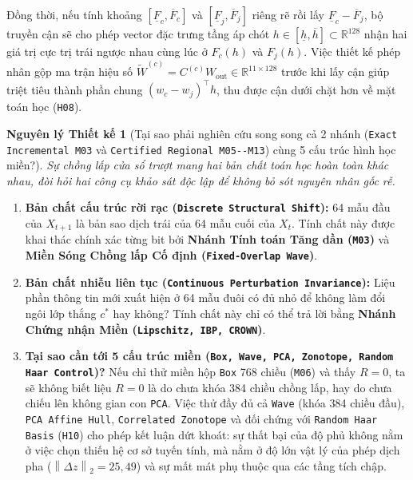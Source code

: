 \documentclass[11pt,a4paper]{article}
\newcommand{\R}{\mathbb{R}}
\newcommand{\norm}[1]{\left\lVert #1\right\rVert}
\newcommand{\code}[1]{{\small\ttfamily\nolinkurl{#1}}}
\newtheorem{principle}{Nguyên lý Thiết kế}[section]
\begin{document}
Đồng thời, nếu tính khoảng $[\underline{F}_c, \overline{F}_c]$ và $[\underline{F}_j, \overline{F}_j]$ riêng rẽ rồi lấy $\underline{F}_c - \overline{F}_j$, bộ truyền cận sẽ cho phép vector đặc trưng tầng áp chót $h \in [\underline{h}, \overline{h}] \subset \R^{128}$ nhận hai giá trị cực trị trái ngược nhau cùng lúc ở $F_c(h)$ và $F_j(h)$. Việc thiết kế phép nhân gộp ma trận hiệu số $\widetilde{W}^{(c)} = C^{(c)} W_{\text{out}} \in \R^{11 \times 128}$ trước khi lấy cận giúp triệt tiêu thành phần chung $(w_c - w_j)^\top h$, thu được cận dưới chặt hơn về mặt toán học (\code{H08}).

\begin{principle}[Tại sao phải nghiên cứu song song cả 2 nhánh (\code{Exact Incremental M03} và \code{Certified Regional M05--M13}) cùng 5 cấu trúc hình học miền?]
Sự chồng lấp cửa sổ trượt mang hai bản chất toán học hoàn toàn khác nhau, đòi hỏi hai công cụ khảo sát độc lập để không bỏ sót nguyên nhân gốc rễ.
\end{principle}
\begin{enumerate}
  \item \textbf{Bản chất cấu trúc rời rạc (\code{Discrete Structural Shift}):} 64 mẫu đầu của $X_{t+1}$ là bản sao dịch trái của 64 mẫu cuối của $X_t$. Tính chất này được khai thác chính xác từng bit bởi \textbf{Nhánh Tính toán Tăng dần (\code{M03})} và \textbf{Miền Sóng Chồng lấp Cố định (\code{Fixed-Overlap Wave})}.
  \item \textbf{Bản chất nhiễu liên tục (\code{Continuous Perturbation Invariance}):} Liệu phần thông tin mới xuất hiện ở 64 mẫu đuôi có đủ nhỏ để không làm đổi ngôi lớp thắng $c^*$ hay không? Tính chất này chỉ có thể trả lời bằng \textbf{Nhánh Chứng nhận Miền (\code{Lipschitz, IBP, CROWN})}.
  \item \textbf{Tại sao cần tới 5 cấu trúc miền (\code{Box, Wave, PCA, Zonotope, Random Haar Control})?} Nếu chỉ thử miền hộp \code{Box} 768 chiều (\code{M06}) và thấy $R=0$, ta sẽ không biết liệu $R=0$ là do chưa khóa 384 chiều chồng lấp, hay do chưa chiếu lên không gian con \code{PCA}. Việc thử đầy đủ cả \code{Wave} (khóa 384 chiều đầu), \code{PCA Affine Hull}, \code{Correlated Zonotope} và đối chứng với \code{Random Haar Basis} (\code{H10}) cho phép kết luận dứt khoát: sự thất bại của độ phủ không nằm ở việc chọn thiếu hệ cơ sở tuyến tính, mà nằm ở độ lớn vật lý của phép dịch pha ($\norm{\Delta z}_2 = 25,49$) và sự mất mát phụ thuộc qua các tầng tích chập.
\end{enumerate}
\end{document}
